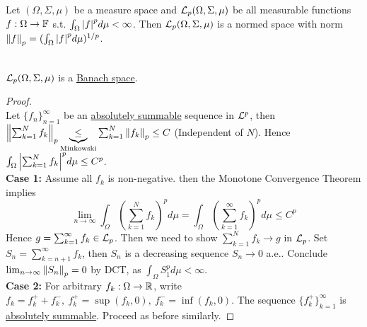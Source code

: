 \np Let $(\Omega, \Sigma,\mu)$ be a measure space and $\mathcal{L}_p(\Omega, \Sigma, \mu)$ be all measurable functions $f: \Omega \to \mathbb{F}$ s.t. $\int_\Omega \abs{f}^p d\mu < \infty$. Then $\mathcal{L}_p (\Omega, \Sigma, \mu)$ is a normed space with norm $\norm{f}_p = (\int_\Omega \abs{f}^p d\mu)^{1/p}$.


\begin{theorem}\ \\
$\mathcal{L}_p(\Omega, \Sigma, \mu)$ is a \underline{Banach space}.
\end{theorem}
\begin{proof}\ \\
Let $\{f_n\}_{n = 1}^\infty$ be an \underline{absolutely summable} sequence in $\mathcal{L}^p$, then $\norm{\sum_{k = 1}^N f_k}_p \underbrace{\leq}_{\text{Minkowski}} \sum_{k = 1}^N \norm{f_k}_p \leq C $ (Independent of $N$). Hence $\int_\Omega \abs{\sum_{k=1}^N f_k}^p d\mu \leq C^p$.\\
\textbf{Case 1:} Assume all $f_k$ is non-negative. then the Monotone Convergence Theorem implies
$$\lim_{n \to \infty} \int_\Omega (\sum_{k=1}^N f_k)^p d\mu = \int_\Omega (\sum_{k=1}^\infty f_k)^p d\mu \leq C^p$$
Hence $g = \sum_{k=1}^\infty f_k \in \mathcal{L}_p$. Then we need to show $\sum_{k=1}^N f_k \to g$ in $\mathcal{L}_p$. Set $S_n = \sum_{k = n + 1}^\infty f_k$, then $S_n$ is a decreasing sequence $S_n \to 0$ a.e.. Conclude $\lim_{n \to \infty} \norm{S_n}_p = 0$ by DCT, as $\int_\Omega S_1^p d\mu < \infty$.\\
\textbf{Case 2:} For arbitrary $f_k: \Omega \to \mathbb{R}$, write $f_k = f_k^+ + f_k^-,\ f_k^+ = \sup{(f_k, 0)},\ f_k^- = \inf(f_k, 0)$. The sequence $\{f_k^+\}_{k = 1}^\infty$ is \underline{absolutely summable}. Proceed as before similarly.
\end{proof}